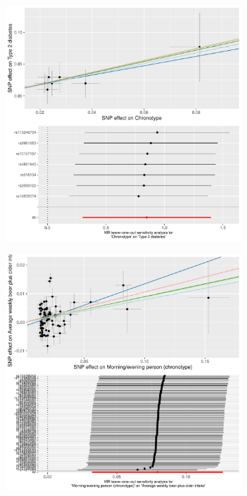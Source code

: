 \documentclass[journal,article,submit,moreauthors,pdftex]{Definitions/mdpi}
\begin{document}
\begin{figure}[htbp]
     \centering
     \begin{subfigure}[b]{0.4\textwidth}
         \centering
         \includegraphics[width=\textwidth]{Figs/Analysis2/Chronotype_vs_Type_2_diabetes.Plots.pdf}
         \caption{}
         \label{t2dm}
     \end{subfigure}
     \begin{subfigure}[b]{0.4\textwidth}
         \centering
         \includegraphics[width=\textwidth]{Figs/Analysis2/Morning_evening_person_(chronotype)_vs_Average_weekly_beer_plus_cider_intake.Plots.pdf}

\end{subfigure}
\end{figure}
\end{document}
